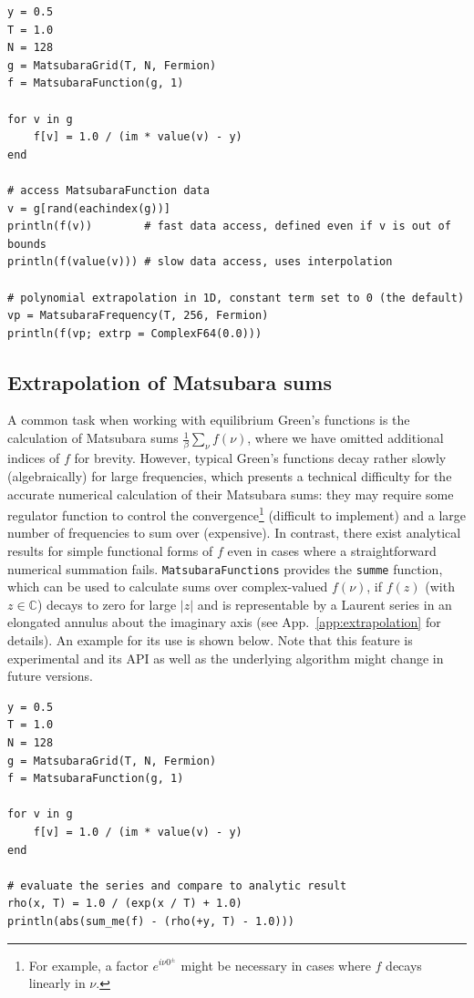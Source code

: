 \documentclass{SciPost}
\begin{document}
%
\begin{verbatim}
y = 0.5
T = 1.0
N = 128
g = MatsubaraGrid(T, N, Fermion)
f = MatsubaraFunction(g, 1)

for v in g
    f[v] = 1.0 / (im * value(v) - y)
end 

# access MatsubaraFunction data
v = g[rand(eachindex(g))]
println(f(v))        # fast data access, defined even if v is out of bounds
println(f(value(v))) # slow data access, uses interpolation

# polynomial extrapolation in 1D, constant term set to 0 (the default)
vp = MatsubaraFrequency(T, 256, Fermion)
println(f(vp; extrp = ComplexF64(0.0))) 
\end{verbatim}

\subsection{Extrapolation of Matsubara sums}
\label{subsec:matsubarasums}

A common task when working with equilibrium Green's functions is the calculation of Matsubara sums $\frac{1}{\beta} \sum_{\nu} f(\nu)$, where we have omitted additional indices of $f$ for brevity. However, typical Green's functions decay rather slowly (algebraically) for large frequencies, which presents a technical difficulty for the accurate numerical calculation of their Matsubara sums: they may require some regulator function to control the convergence\footnote{For example, a factor $e^{i\nu 0^{\pm}}$ might be necessary in cases where $f$ decays linearly in $\nu$.} (difficult to implement) and a large number of frequencies to sum over (expensive). In contrast, there exist analytical results for simple functional forms of $f$ even in cases where a straightforward numerical summation fails. \texttt{MatsubaraFunctions} provides the \texttt{sum\textunderscore me} function, which can be used to calculate sums over complex-valued $f(\nu)$, if $f(z)$ (with $z \in \mathbb{C}$) decays to zero for large $|z|$ and is representable by a Laurent series in an elongated annulus about the imaginary axis (see App.~\ref{app:extrapolation} for details). An example for its use is shown below. Note that this feature is experimental and its API as well as the underlying algorithm might change in future versions.
%
\begin{verbatim}
y = 0.5
T = 1.0
N = 128
g = MatsubaraGrid(T, N, Fermion)
f = MatsubaraFunction(g, 1)

for v in g
    f[v] = 1.0 / (im * value(v) - y)
end 

# evaluate the series and compare to analytic result
rho(x, T) = 1.0 / (exp(x / T) + 1.0)
println(abs(sum_me(f) - (rho(+y, T) - 1.0)))
\end{verbatim}
\end{document}
